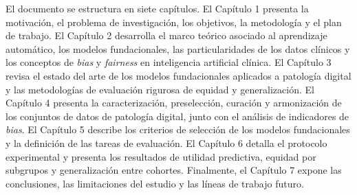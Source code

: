 El documento se estructura en siete capítulos. El Capítulo 1 presenta la motivación, el problema de investigación, los objetivos, la metodología y el plan de trabajo. El Capítulo 2 desarrolla el marco teórico asociado al aprendizaje automático, los modelos fundacionales, las particularidades de los datos clínicos y los conceptos de \textit{bias} y \textit{fairness} en inteligencia artificial clínica. El Capítulo 3 revisa el estado del arte de los modelos fundacionales aplicados a patología digital y las metodologías de evaluación rigurosa de equidad y generalización. El Capítulo 4 presenta la caracterización, preselección, curación y armonización de los conjuntos de datos de patología digital, junto con el análisis de indicadores de \textit{bias}. El Capítulo 5 describe los criterios de selección de los modelos fundacionales y la definición de las tareas de evaluación. El Capítulo 6 detalla el protocolo experimental y presenta los resultados de utilidad predictiva, equidad por subgrupos y generalización entre cohortes. Finalmente, el Capítulo 7 expone las conclusiones, las limitaciones del estudio y las líneas de trabajo futuro.